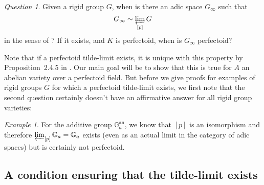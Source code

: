 \documentclass[10pt,oneside]{amsart}
\theoremstyle{definition}
\theoremstyle{remark}
\newtheorem*{example}{Example}
\newtheorem*{question}{Question}
\begin{document}
	\begin{framed}
	\begin{question}
		Given a rigid group $G$, when is there an adic space $G_\infty$ such that \[G_\infty \sim  \varprojlim_{[p]} G\] in the sense of \cite{SW}? If it exists, and $K$ is perfectoid, when is $G_\infty$ perfectoid?
	\end{question}
	\end{framed}
	Note that if a perfectoid tilde-limit exists, it is unique with this property by Proposition~2.4.5 in \cite{SW}.
	Our main goal will be to show that this is true for $A$ an abelian variety over a perfectoid field.
	But before we give proofs for examples of rigid groups $G$ for which a perfectoid tilde-limit exists, we first note that the second question certainly doesn't have an affirmative answer for all rigid group varieties:
	\begin{example}
		For the additive group $\mathbb G_a^{\operatorname{an}}$, we know that $[p]$ is an isomorphism and therefore $\varprojlim_{[p]} \mathbb G_a=\mathbb G_a$ exists (even as an actual limit in the category of adic spaces) but is certainly not perfectoid.
	\end{example}
	\subsection{A condition ensuring that the tilde-limit exists}
  
\end{document}
